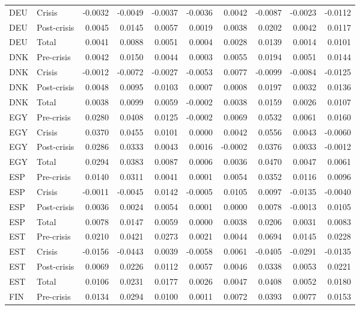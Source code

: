 \begin{longtable}[t]{llrrrrrrrr}
DEU & Crisis & -0.0032 & -0.0049 & -0.0037 & -0.0036 & 0.0042 & -0.0087 & -0.0023 & -0.0112\\
DEU & Post-crisis & 0.0045 & 0.0145 & 0.0057 & 0.0019 & 0.0038 & 0.0202 & 0.0042 & 0.0117\\
DEU & Total & 0.0041 & 0.0088 & 0.0051 & 0.0004 & 0.0028 & 0.0139 & 0.0014 & 0.0101\\
\addlinespace
DNK & Pre-crisis & 0.0042 & 0.0150 & 0.0044 & 0.0003 & 0.0055 & 0.0194 & 0.0051 & 0.0144\\
DNK & Crisis & -0.0012 & -0.0072 & -0.0027 & -0.0053 & 0.0077 & -0.0099 & -0.0084 & -0.0125\\
DNK & Post-crisis & 0.0048 & 0.0095 & 0.0103 & 0.0007 & 0.0008 & 0.0197 & 0.0032 & 0.0136\\
DNK & Total & 0.0038 & 0.0099 & 0.0059 & -0.0002 & 0.0038 & 0.0159 & 0.0026 & 0.0107\\
EGY & Pre-crisis & 0.0280 & 0.0408 & 0.0125 & -0.0002 & 0.0069 & 0.0532 & 0.0061 & 0.0160\\
\addlinespace
EGY & Crisis & 0.0370 & 0.0455 & 0.0101 & 0.0000 & 0.0042 & 0.0556 & 0.0043 & -0.0060\\
EGY & Post-crisis & 0.0286 & 0.0333 & 0.0043 & 0.0016 & -0.0002 & 0.0376 & 0.0033 & -0.0012\\
EGY & Total & 0.0294 & 0.0383 & 0.0087 & 0.0006 & 0.0036 & 0.0470 & 0.0047 & 0.0061\\
ESP & Pre-crisis & 0.0140 & 0.0311 & 0.0041 & 0.0001 & 0.0054 & 0.0352 & 0.0116 & 0.0096\\
ESP & Crisis & -0.0011 & -0.0045 & 0.0142 & -0.0005 & 0.0105 & 0.0097 & -0.0135 & -0.0040\\
\addlinespace
ESP & Post-crisis & 0.0036 & 0.0024 & 0.0054 & 0.0001 & 0.0000 & 0.0078 & -0.0013 & 0.0105\\
ESP & Total & 0.0078 & 0.0147 & 0.0059 & 0.0000 & 0.0038 & 0.0206 & 0.0031 & 0.0083\\
EST & Pre-crisis & 0.0210 & 0.0421 & 0.0273 & 0.0021 & 0.0044 & 0.0694 & 0.0145 & 0.0228\\
EST & Crisis & -0.0156 & -0.0443 & 0.0039 & -0.0058 & 0.0061 & -0.0405 & -0.0291 & -0.0135\\
EST & Post-crisis & 0.0069 & 0.0226 & 0.0112 & 0.0057 & 0.0046 & 0.0338 & 0.0053 & 0.0221\\
\addlinespace
EST & Total & 0.0106 & 0.0231 & 0.0177 & 0.0026 & 0.0047 & 0.0408 & 0.0052 & 0.0180\\
FIN & Pre-crisis & 0.0134 & 0.0294 & 0.0100 & 0.0011 & 0.0072 & 0.0393 & 0.0077 & 0.0153\\

\end{longtable}
